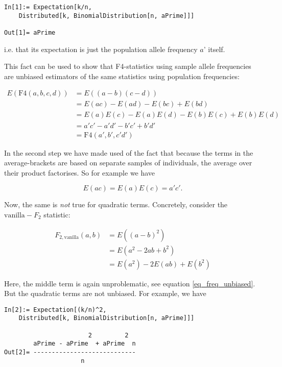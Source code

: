 \documentclass{article}
\begin{document}
\begin{lstlisting}
In[1]:= Expectation[k/n, 
    Distributed[k, BinomialDistribution[n, aPrime]]]

Out[1]= aPrime
\end{lstlisting}

i.e. that its expectation is just the population allele frequency \(a\){'} itself.

This fact can be used to show that F4-statistics using sample allele frequencies are unbiased estimators of the same statistics using population
frequencies:

\begin{equation}
\begin{split}
E\left( \text{F4}(a,b,c,d)\right) &=E((a-b)(c-d)) \\
&=E(ac) -E(ad) -E(bc) +E(bd) \\
&= E(a) E(c) -E(a) E(d) -E(b) E(c) +E(b) E(d) \\
&=a'c'-a'd'-b'c'+b'd'\\
&=\text{F4}(a',b',c'd')
\end{split}
\end{equation}

In the second step we have made used of the fact that because the terms in the average-brackets are based on separate samples of individuals, the
average over their product factorises. So for example we have 

\begin{equation}
\label{eq_freq_unbiased}
E(a c) =E(a) E(c) =a' c' .
\end{equation}

Now, the same is \textit{ not }true for quadratic terms. Concretely, consider the \(\text{vanilla}-F_2\) { }statistic:

\begin{equation}
\begin{split}
F_{2,\text{vanilla}}(a,b)&=E\left((a-b)^2\right)\\
&= E\left(a^2-2a b+b^2\right)\\
&= E\left(a^2\right) -2E\left(a b\right)
+E(b^2)
\end{split}
\end{equation}

Here, the middle term is again unproblematic, see equation \ref{eq_freq_unbiased}. But the quadratic terms are not unbiased. For example, we have

\begin{lstlisting}
In[2]:= Expectation[(k/n)^2,                                                    
    Distributed[k, BinomialDistribution[n, aPrime]]]                            

                       2         2
        aPrime - aPrime  + aPrime  n
Out[2]= ----------------------------
                     n
\end{lstlisting}
\end{document}

